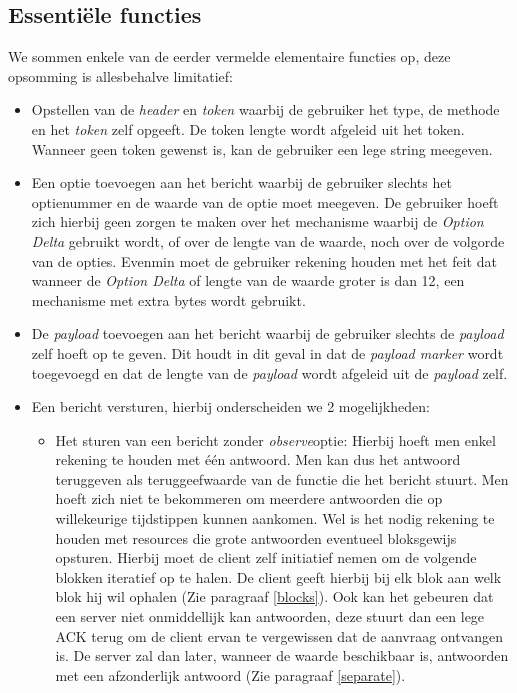 \subsection{Essenti\"{e}le functies} \label{essentielefuncties}

We sommen enkele van de eerder vermelde elementaire functies op, deze opsomming is allesbehalve limitatief:

\begin{itemize}
\item Opstellen van de \textit{header} en \textit{token} waarbij de gebruiker het type, de methode en het \textit{token} zelf opgeeft. De token lengte wordt afgeleid uit het token. Wanneer geen token gewenst is, kan de gebruiker een lege string meegeven.
\item Een optie toevoegen aan het bericht waarbij de gebruiker slechts het optienummer en de waarde van de optie moet meegeven. De gebruiker hoeft zich hierbij geen zorgen te maken over het mechanisme waarbij de \textit{Option Delta} gebruikt wordt, of over de lengte van de waarde, noch over de volgorde van de opties. Evenmin moet de gebruiker rekening houden met het feit dat wanneer de \textit{Option Delta} of lengte van de waarde groter is dan 12, een mechanisme met extra bytes wordt gebruikt.
\item De \textit{payload} toevoegen aan het bericht waarbij de gebruiker slechts de \textit{payload} zelf hoeft op te geven.  Dit houdt in dit geval in dat de \textit{payload marker} wordt toegevoegd en dat de lengte van de \textit{payload} wordt afgeleid uit de \textit{payload} zelf.
\item Een bericht versturen, hierbij onderscheiden we 2 mogelijkheden:
\begin{itemize}
\item Het sturen van een bericht zonder \textit{observe}optie: Hierbij hoeft men enkel rekening te houden met \'{e}\'{e}n antwoord. Men kan dus het antwoord teruggeven als teruggeefwaarde van de functie die het bericht stuurt. Men hoeft zich niet te bekommeren om meerdere antwoorden die op willekeurige tijdstippen kunnen aankomen. Wel is het nodig rekening te houden met resources die grote antwoorden eventueel bloksgewijs opsturen. Hierbij moet de client zelf initiatief nemen om de volgende blokken iteratief op te halen. De client geeft hierbij bij elk blok aan welk blok hij wil ophalen (Zie paragraaf \ref{blocks}). Ook kan het gebeuren dat een server niet onmiddellijk kan antwoorden, deze stuurt dan een lege ACK terug om de client ervan te vergewissen dat de aanvraag ontvangen is. De server zal dan later, wanneer de waarde beschikbaar is, antwoorden met een afzonderlijk antwoord (Zie paragraaf \ref{separate}).

\end{itemize}
\end{itemize}
